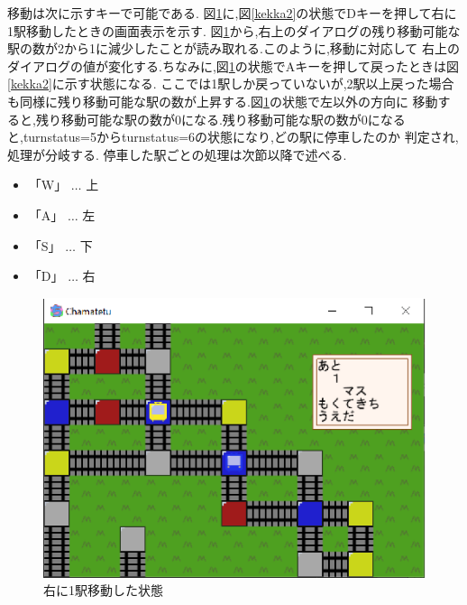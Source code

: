 \documentclass[a4j]{jarticle}
\begin{document}
    移動は次に示すキーで可能である. 図\ref{kekkamigi}に,図\ref{kekka2}の状態でDキーを押して右に1駅移動したときの画面表示を示す.
    図\ref{kekkamigi}から,右上のダイアログの残り移動可能な駅の数が2から1に減少したことが読み取れる.このように,移動に対応して
    右上のダイアログの値が変化する.ちなみに,図\ref{kekkamigi}の状態でAキーを押して戻ったときは図\ref{kekka2}に示す状態になる.
    ここでは1駅しか戻っていないが,2駅以上戻った場合も同様に残り移動可能な駅の数が上昇する.図\ref{kekkamigi}の状態で左以外の方向に
    移動すると,残り移動可能な駅の数が0になる.残り移動可能な駅の数が0になると,turnstatus=5からturnstatus=6の状態になり,どの駅に停車したのか
    判定され,処理が分岐する. 停車した駅ごとの処理は次節以降で述べる.

    \begin{itemize}
        \item 「W」 $\dots$ 上
        \item 「A」 $\dots$ 左
        \item 「S」 $\dots$ 下
        \item 「D」 $\dots$ 右
    \end{itemize}

    \begin{figure}[H]
        \centering
        \includegraphics[scale=1.3]{kekkamigi.eps}
        \caption{右に1駅移動した状態}
         \label{kekkamigi}
        \end{figure} 
\end{document}
